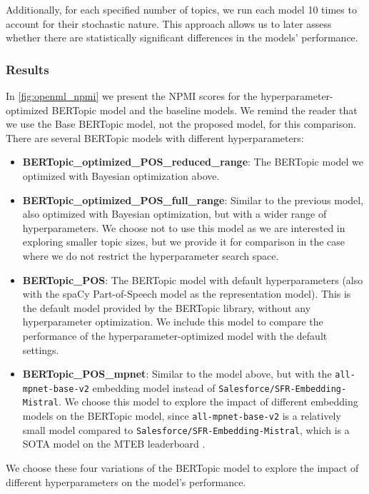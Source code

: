 Additionally, for each specified number of topics, we run each model 10 times to account for their stochastic nature. This approach allows us to later assess whether there are statistically significant differences in the models' performance.

\subsubsection{Results}
In \cref{fig:openml_npmi} we present the NPMI scores for the hyperparameter-optimized BERTopic model and the baseline models. We remind the reader that we use the Base BERTopic model, not the proposed model, for this comparison. There are several BERTopic models with different hyperparameters:
\begin{itemize}
    \item \textbf{BERTopic\_optimized\_POS\_reduced\_range}: The BERTopic model we optimized with Bayesian optimization above.
    \item \textbf{BERTopic\_optimized\_POS\_full\_range}: Similar to the previous model, also optimized with Bayesian optimization, but with a wider range of hyperparameters. We choose not to use this model as we are interested in exploring smaller topic sizes, but we provide it for comparison in the case where we do not restrict the hyperparameter search space.
    \item \textbf{BERTopic\_POS}: The BERTopic model with default hyperparameters (also with the spaCy Part-of-Speech model as the representation model). This is the default model provided by the BERTopic library, without any hyperparameter optimization. We include this model to compare the performance of the hyperparameter-optimized model with the default settings.
    \item \textbf{BERTopic\_POS\_mpnet}: Similar to the model above, but with the \texttt{all-mpnet-base-v2} embedding model instead of \texttt{Salesforce/\allowbreak SFR-Embedding-\allowbreak Mistral}. We choose this model to explore the impact of different embedding models on the BERTopic model, since \texttt{all\allowbreak-mpnet\allowbreak-base\allowbreak-v2} is a relatively small model compared to \texttt{Salesforce/\allowbreak SFR-Embedding-\allowbreak Mistral}, which is a SOTA model on the MTEB leaderboard \cite{muennighoff_mteb_2023}.
\end{itemize}

We choose these four variations of the BERTopic model to explore the impact of different hyperparameters on the model's performance. 

